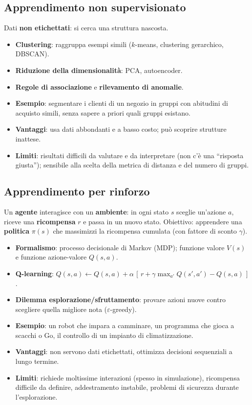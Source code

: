 \subsection{Apprendimento non supervisionato}
Dati \textbf{non etichettati}: si cerca una struttura nascosta.
\begin{itemize}
    \item \textbf{Clustering}: raggruppa esempi simili ($k$-means, clustering gerarchico, DBSCAN).
    \item \textbf{Riduzione della dimensionalità}: PCA, autoencoder.
    \item \textbf{Regole di associazione} e \textbf{rilevamento di anomalie}.
    \item \textbf{Esempio}: segmentare i clienti di un negozio in gruppi con abitudini di acquisto simili, senza sapere a priori quali gruppi esistano.
    \item \textbf{Vantaggi}: usa dati abbondanti e a basso costo; può scoprire strutture inattese.
    \item \textbf{Limiti}: risultati difficili da valutare e da interpretare (non c'è una ``risposta giusta''); sensibile alla scelta della metrica di distanza e del numero di gruppi.
\end{itemize}

\subsection{Apprendimento per rinforzo}
Un \textbf{agente} interagisce con un \textbf{ambiente}: in ogni stato $s$ sceglie un'azione $a$, riceve una \textbf{ricompensa} $r$ e passa in un nuovo stato. Obiettivo: apprendere una \textbf{politica} $\pi(s)$ che massimizzi la ricompensa cumulata (con fattore di sconto $\gamma$).
\begin{itemize}
    \item \textbf{Formalismo}: processo decisionale di Markov (MDP); funzione valore $V(s)$ e funzione azione-valore $Q(s,a)$.
    \item \textbf{Q-learning}: $Q(s,a) \leftarrow Q(s,a) + \alpha\,[\,r + \gamma \max_{a'} Q(s',a') - Q(s,a)\,]$.
    \item \textbf{Dilemma esplorazione/sfruttamento}: provare azioni nuove contro scegliere quella migliore nota ($\varepsilon$-greedy).
    \item \textbf{Esempio}: un robot che impara a camminare, un programma che gioca a scacchi o Go, il controllo di un impianto di climatizzazione.
    \item \textbf{Vantaggi}: non servono dati etichettati, ottimizza decisioni sequenziali a lungo termine.
    \item \textbf{Limiti}: richiede moltissime interazioni (spesso in simulazione), ricompensa difficile da definire, addestramento instabile, problemi di sicurezza durante l'esplorazione.
\end{itemize}

